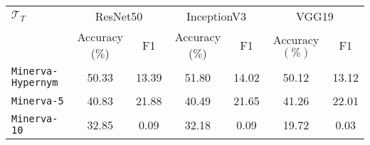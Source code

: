\begin{tabular}{l|cc|cc|cc} \hline
	$\mathcal{T}_T$ &  \multicolumn{2}{c}{ResNet50} & \multicolumn{2}{|c|}{InceptionV3} & \multicolumn{2}{c}{VGG19}\\
			& Accuracy ($\%$) & F1 & Accuracy ($\%$) & F1 & Accuracy $(\%)$ & F1 \\\hline \hline
	\texttt{Minerva-Hypernym} & 50.33 & 13.39 & 51.80 & 14.02 & 50.12 & 13.12 \\
	\texttt{Minerva-5} & 40.83  & 21.88 & 40.49 & 21.65 & 41.26 & 22.01\\
	\texttt{Minerva-10} & 32.85 & 0.09  & 32.18 & 0.09 & 19.72 & 0.03 \\
\hline
\end{tabular}

